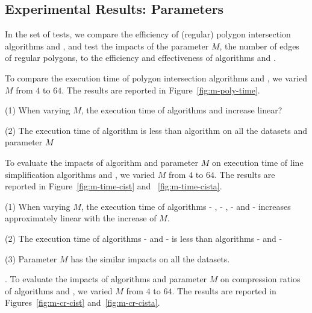 \subsection{Experimental Results: Parameters}

In the set of tests, we compare the efficiency of (regular) polygon intersection algorithms \rpia and \cpia, and test the impacts of the parameter $M$, \ie the number of edges of regular polygons, to the efficiency and effectiveness of algorithms \cist and \cista.


To compare the execution time of polygon intersection algorithms \rpia and \cpia, we varied $M$ from $4$ to $64$.
The results are reported in Figure~\ref{fig:m-poly-time}.


\ni(1) When varying $M$, the execution time of algorithms \rpia and \cpia increase linear?

\ni(2) The execution time of algorithm \rpia is less than algorithm \cpia on all the datasets and parameter $M$


To evaluate the impacts of algorithm \rpia and parameter $M$ on execution time of line simplification algorithms \cist and \cista, we varied $M$ from $4$ to $64$.
The results are reported in Figure~\ref{fig:m-time-cist} and ~\ref{fig:m-time-cista}.

\ni(1) When varying $M$, the execution time of algorithms \cist - \rpia, \cist - \cpia, \cista- \rpia and \cista- \cpia increases approximately linear with the increase of $M$.

\ni(2) The execution time of algorithms \cist - \rpia and \cista- \rpia is less than algorithms \cist - \cpia and \cista- \cpia

\ni(3) Parameter $M$ has the similar impacts on all the datasets.

.
To evaluate the impacts of algorithms \rpia and parameter $M$ on compression ratios of algorithms \cist and \cista, we varied $M$ from $4$ to $64$.
The results are reported in Figures~\ref{fig:m-cr-cist} and~\ref{fig:m-cr-cista}.


